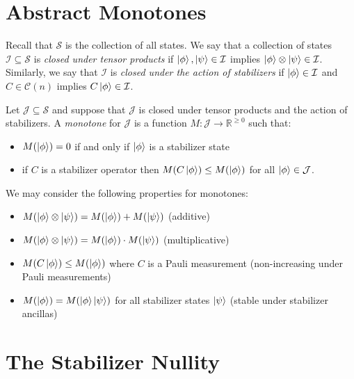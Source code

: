 \documentclass[12pt]{dalthesis}
\begin{document}
\section{Abstract Monotones}
Recall that $\mathcal{S}$ is the collection of all states. We say that a collection of states $\mathcal{I} \subseteq \mathcal{S}$ is \emph{closed under tensor products} if $\ket{\phi}, \ket{\psi} \in \mathcal{I}$ implies $\ket{\phi} \otimes \ket{\psi} \in \mathcal{I}$. Similarly, we say that $\mathcal{I}$ is \emph{closed under the action of stabilizers} if $\ket{\phi} \in \mathcal{I}$ and $C \in \mathcal{C}(n)$ implies $C\ket{\phi} \in \mathcal{I}$.

\begin{definition}
Let $\mathcal{J} \subseteq \mathcal{S}$ and suppose that $\mathcal{J}$ is closed under tensor products and the action of stabilizers. A \emph{monotone} for $\mathcal{J}$ is a function $M: \mathcal{J} \rightarrow \mathbb{R}^{\geq 0}$ such that:
\begin{itemize}
\item $M(\ket{\phi}) = 0$ if and only if $\ket{\phi}$ is a stabilizer state
\item if $C$ is a stabilizer operator then $M(C\ket{\phi}) \leq M(\ket{\phi})$ for all $\ket{\phi} \in \mathcal{J}$.
\end{itemize} 
\end{definition}

\begin{proposition} 
We may consider the following properties for monotones:
\begin{itemize}
\item $M(\ket{\phi} \otimes \ket{\psi}) = M(\ket{\phi}) + M(\ket{\psi})$ (additive) 
\item $M(\ket{\phi} \otimes \ket{\psi}) = M(\ket{\phi}) \cdot M(\ket{\psi})$ (multiplicative)
\item $M(C\ket{\phi}) \leq M(\ket{\phi})$ where $C$ is a Pauli measurement (non-increasing under Pauli measurements)
\item $M(\ket{\phi}) = M(\ket{\phi}\ket{\psi})$ for all stabilizer states $\ket{\psi}$ (stable under stabilizer ancillas)
\end{itemize}
\end{proposition}

\section{The Stabilizer Nullity}
\end{document}
